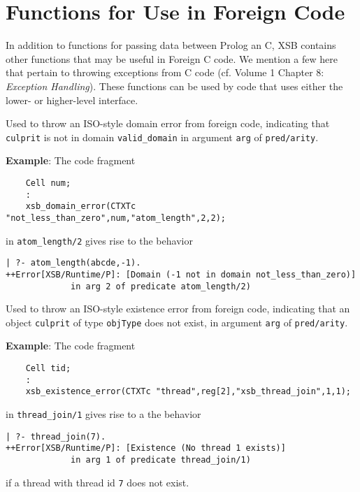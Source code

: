 \section{Functions for Use in Foreign Code}

In addition to functions for passing data between Prolog an C, XSB
contains other functions that may be useful in Foreign C code.  We
mention a few here that pertain to throwing exceptions from C code
(cf. Volume 1 Chapter 8: {\em Exception Handling}).  These functions
can be used by code that uses either the lower- or higher-level
interface.

\begin{description}
%
Used to throw an ISO-style domain error from foreign code, indicating
that {\tt culprit} is not in domain {\tt valid\_domain} in argument
{\tt arg} of {\tt pred/arity}.

{\bf Example}: The code fragment
%
\begin{verbatim}
    Cell num;
    : 
    xsb_domain_error(CTXTc "not_less_than_zero",num,"atom_length",2,2);
\end{verbatim}
in {\tt atom\_length/2} gives rise to the behavior
%
\begin{verbatim}
| ?- atom_length(abcde,-1).
++Error[XSB/Runtime/P]: [Domain (-1 not in domain not_less_than_zero)] 
             in arg 2 of predicate atom_length/2)
\end{verbatim}


%
Used to throw an ISO-style existence error from foreign code,
indicating that an object {\tt culprit} of type {\tt objType} does not
exist, in argument {\tt arg} of {\tt pred/arity}.

{\bf Example}: The code fragment
%
\begin{verbatim}
    Cell tid;
    :
    xsb_existence_error(CTXTc "thread",reg[2],"xsb_thread_join",1,1); 
\end{verbatim}
in {\tt thread\_join/1} gives rise to a the behavior
\begin{verbatim}
| ?- thread_join(7).
++Error[XSB/Runtime/P]: [Existence (No thread 1 exists)] 
             in arg 1 of predicate thread_join/1)
\end{verbatim}
if a thread with thread id {\tt 7} does not exist.


\end{description}
